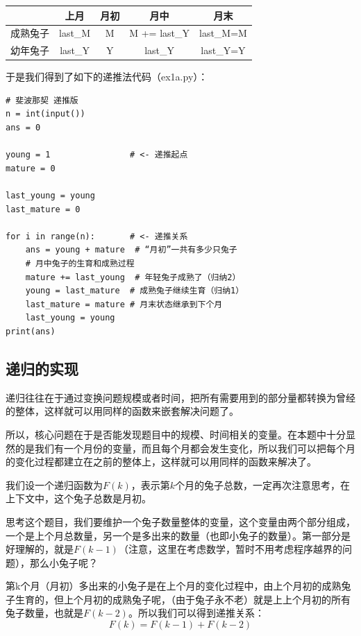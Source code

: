 \documentclass{article}
\begin{document}
\begin{table}[htbp]
    \centering
    \Large
    \begin{tabular}{|c|c|c|c|c|}
        \hline
             & 上月      & 月初 & 月中      & 月末        \\ \hline
        成熟兔子 & last\_M & M  & M += last\_Y  & last\_M=M \\ \hline
        幼年兔子 & last\_Y & Y  & last\_Y & last\_Y=Y \\ \hline
        \end{tabular}
\end{table}

于是我们得到了如下的递推法代码（ex1a.py）：
\begin{lstlisting}
# 斐波那契 递推版
n = int(input())
ans = 0

young = 1                # <- 递推起点
mature = 0

last_young = young
last_mature = 0

for i in range(n):       # <- 递推关系
    ans = young + mature  # “月初”一共有多少只兔子
    # 月中兔子的生育和成熟过程
    mature += last_young  # 年轻兔子成熟了（归纳2）
    young = last_mature  # 成熟兔子继续生育（归纳1）
    last_mature = mature # 月末状态继承到下个月
    last_young = young
print(ans)
\end{lstlisting}

\subsection{递归的实现}\label{recursive}

递归往往在于通过变换问题规模或者时间，把所有需要用到的部分量都转换为曾经的整体，这样就可以用同样的函数来嵌套解决问题了。

所以，核心问题在于是否能发现题目中的规模、时间相关的变量。在本题中十分显然的是我们有一个月份的变量，而且每个月都会发生变化，所以我们可以把每个月的变化过程都建立在之前的整体上，这样就可以用同样的函数来解决了。

我们设一个递归函数为$F(k)$，表示第$k$个月的兔子总数，一定再次注意思考，在上下文中，这个兔子总数是月初。

思考这个题目，我们要维护一个兔子数量整体的变量，这个变量由两个部分组成，一个是上个月总数量，另一个是多出来的数量（也即小兔子的数量）。第一部分是好理解的，就是$F(k-1)$（注意，这里在考虑数学，暂时不用考虑程序越界的问题），那么小兔子呢？

第k个月（月初）多出来的小兔子是在上个月的变化过程中，由上个月初的成熟兔子生育的，但上个月初的成熟兔子呢，（由于兔子永不老）就是上上个月初的所有兔子数量，也就是$F(k-2)$。所以我们可以得到递推关系：
\begin{equation}
    F(k) = F(k-1) + F(k-2)
\end{equation}
\end{document}
